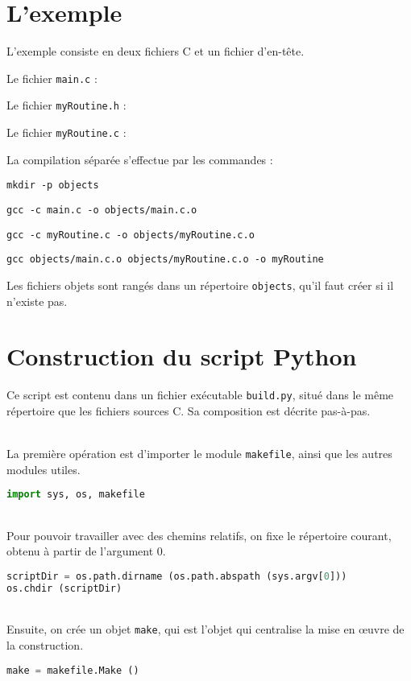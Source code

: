 \documentclass[a4paper,12pt,obeyspaces,openany]{extarticle}
\begin{document}
\section{L'exemple}

L'exemple consiste en deux fichiers C et un fichier d'en-tête.

Le fichier \texttt{main.c} :



Le fichier \texttt{myRoutine.h} :



Le fichier \texttt{myRoutine.c} :


La compilation séparée s'effectue par les commandes :

\texttt{mkdir -p objects}

\texttt{gcc -c main.c -o objects/main.c.o}

\texttt{gcc -c myRoutine.c -o objects/myRoutine.c.o}

\texttt{gcc objects/main.c.o objects/myRoutine.c.o -o myRoutine}


Les fichiers objets sont rangés dans un répertoire \texttt{objects}, qu'il faut créer si il n'existe pas.


\section{Construction du script Python}

Ce script est contenu dans un fichier exécutable \texttt{build.py}, situé dans le même répertoire que les fichiers sources C. Sa composition est décrite pas-à-pas.

~\\La première opération est d'importer le module \texttt{makefile}, ainsi que les autres modules utiles.
\begin{lstlisting}[language=py]
import sys, os, makefile
\end{lstlisting}

~\\Pour pouvoir travailler avec des chemins relatifs, on fixe le répertoire courant, obtenu à partir de l'argument $0$.
\begin{lstlisting}[language=py]
scriptDir = os.path.dirname (os.path.abspath (sys.argv[0]))
os.chdir (scriptDir)
\end{lstlisting}

~\\Ensuite, on crée un objet \texttt{make}, qui est l'objet qui centralise la mise en œuvre de la construction.
\begin{lstlisting}[language=py]
make = makefile.Make ()
\end{lstlisting}
\end{document}
